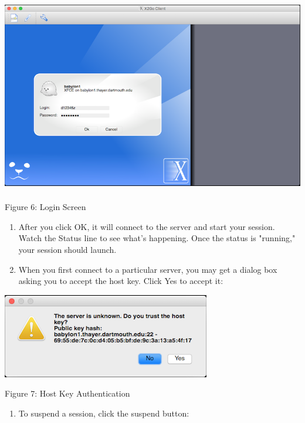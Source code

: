 \documentclass[
]{article}
\begin{document}
\includegraphics[width=5.50787in,height=3.38189in]{images/media/image6.png}

Figure 6: Login Screen

\begin{enumerate}
\def\labelenumi{\arabic{enumi}.}
\setcounter{enumi}{10}
\item
  After you click OK, it will connect to the server and start your
  session. Watch the Status line to see what's happening. Once the
  status is "running," your session should launch.
\item
  When you first connect to a particular server, you may get a dialog
  box asking you to accept the host key. Click Yes to accept it:
\end{enumerate}

\includegraphics[width=3.58289in,height=1.45815in]{images/media/image7.png}

Figure 7: Host Key Authentication

\begin{enumerate}
\def\labelenumi{\arabic{enumi}.}
\setcounter{enumi}{12}
\item
  To suspend a session, click the suspend button:
\end{enumerate}
\end{document}
